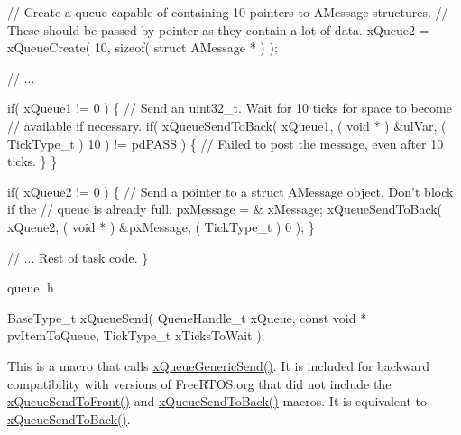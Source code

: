 \begin{DoxyPre}   // Create a queue capable of containing 10 pointers to AMessage structures.
   // These should be passed by pointer as they contain a lot of data.
   xQueue2 = xQueueCreate( 10, sizeof( struct AMessage * ) );\end{DoxyPre}



\begin{DoxyPre}   // ...\end{DoxyPre}



\begin{DoxyPre}   if( xQueue1 != 0 )
   \{
    // Send an uint32\_t.  Wait for 10 ticks for space to become
    // available if necessary.
    if( xQueueSendToBack( xQueue1, ( void * ) \&ulVar, ( TickType\_t ) 10 ) != pdPASS )
    \{
        // Failed to post the message, even after 10 ticks.
    \}
   \}\end{DoxyPre}



\begin{DoxyPre}   if( xQueue2 != 0 )
   \{
    // Send a pointer to a struct AMessage object.  Don't block if the
    // queue is already full.
    pxMessage = \& xMessage;
    xQueueSendToBack( xQueue2, ( void * ) \&pxMessage, ( TickType\_t ) 0 );
   \}\end{DoxyPre}



\begin{DoxyPre}   // ... Rest of task code.
\}
\end{DoxyPre}


queue. h 
\begin{DoxyPre}
BaseType\_t xQueueSend(
                          QueueHandle\_t xQueue,
                          const void * pvItemToQueue,
                          TickType\_t xTicksToWait
                     );
  \end{DoxyPre}


This is a macro that calls \mbox{\hyperlink{queue_8h_a7ce86d1026e0c3055a523935bf53c0b3}{x\+Queue\+Generic\+Send()}}. It is included for backward compatibility with versions of Free\+R\+T\+O\+S.\+org that did not include the \mbox{\hyperlink{queue_8h_aa612fcc2b1ceee0200f34b942e300b41}{x\+Queue\+Send\+To\+Front()}} and \mbox{\hyperlink{queue_8h_a81d24a2c1199d58efb76fbee15853112}{x\+Queue\+Send\+To\+Back()}} macros. It is equivalent to \mbox{\hyperlink{queue_8h_a81d24a2c1199d58efb76fbee15853112}{x\+Queue\+Send\+To\+Back()}}.

